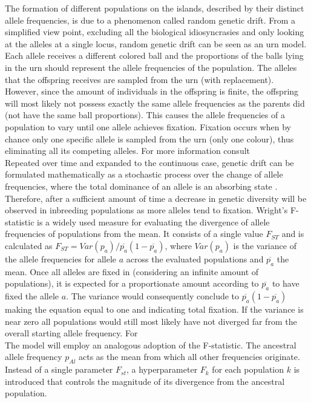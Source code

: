 \documentclass[a4paper, 11pt]{article}
\begin{document}
The formation of different populations on the islands, described by their distinct allele frequencies, is due to a phenomenon called random genetic drift. From a simplified view point, excluding all the biological idiosyncrasies and only looking at the alleles at a single locus, random genetic drift can be seen as an urn model. Each allele receives a different colored ball and the  proportions of the balls lying in the urn should represent the allele frequencies of the population. The alleles that the offspring receives are sampled from the urn (with replacement). However, since the amount of individuals in the offspring is finite, the offspring will most likely not possess exactly the same allele frequencies as the parents did (not have the same ball proportions). This causes the allele frequencies of a population to vary until one allele achieves fixation. Fixation occurs when by chance only one specific allele is sampled from the urn  (only one colour), thus eliminating all its competing alleles. For more information consult \parencite{hartl1997principles, gillespie2004population}\\

Repeated over time and expanded to the continuous case, genetic drift can be formulated mathematically as a stochastic process over the change of allele frequencies, where the total dominance of an allele is an absorbing state \parencite{crow1970introduction}. Therefore, after a sufficient amount of time a decrease in genetic diversity will be observed in inbreeding populations as more alleles tend to fixation. Wright's F-statistic is a widely used measure for evaluating the divergence of allele frequencies of populations from the mean. It consists of a single value $F_{ST}$ and is calculated as $F_{ST} = Var(p_a) / \overline{p_a}(1-\overline{p_a})$, where $Var(p_a)$ is the variance of the allele frequencies for allele $a$ across the evaluated populations and $\overline{p_a}$ the mean. Once all alleles are fixed in (considering an infinite amount of populations), it is expected for a proportionate amount according to $\overline{p_a}$ to have fixed the allele $a$. The variance would consequently conclude to $\overline{p_a}(1-\overline{p_a})$ making the equation equal to one and indicating total fixation. If the variance is near zero all populations would still most likely have not diverged far from the overall starting allele frequency. For \\

The model will employ an analogous adoption of the F-statistic. The ancestral allele frequency $p_{Al}$ acts as the mean from which all other frequencies originate. Instead of a single parameter $F_{st}$, a hyperparameter $F_k$ for each population $k$ is introduced that controls the magnitude of its divergence from the ancestral population.\\
\end{document}
